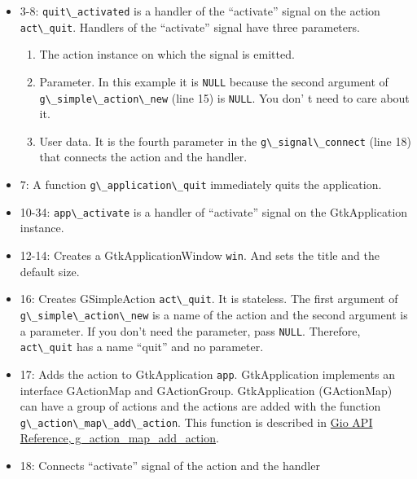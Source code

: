 \begin{itemize}
\tightlist
\item
  3-8: \passthrough{\lstinline!quit\_activated!} is a handler of the
  ``activate'' signal on the action \passthrough{\lstinline!act\_quit!}.
  Handlers of the ``activate'' signal have three parameters.

  \begin{enumerate}
  \def\labelenumi{\arabic{enumi}.}
  \tightlist
  \item
    The action instance on which the signal is emitted.
  \item
    Parameter. In this example it is \passthrough{\lstinline!NULL!}
    because the second argument of
    \passthrough{\lstinline!g\_simple\_action\_new!} (line 15) is
    \passthrough{\lstinline!NULL!}. You don' t need to care about it.
  \item
    User data. It is the fourth parameter in the
    \passthrough{\lstinline!g\_signal\_connect!} (line 18) that connects
    the action and the handler.
  \end{enumerate}
\item
  7: A function \passthrough{\lstinline!g\_application\_quit!}
  immediately quits the application.
\item
  10-34: \passthrough{\lstinline!app\_activate!} is a handler of
  ``activate'' signal on the GtkApplication instance.
\item
  12-14: Creates a GtkApplicationWindow \passthrough{\lstinline!win!}.
  And sets the title and the default size.
\item
  16: Creates GSimpleAction \passthrough{\lstinline!act\_quit!}. It is
  stateless. The first argument of
  \passthrough{\lstinline!g\_simple\_action\_new!} is a name of the
  action and the second argument is a parameter. If you don't need the
  parameter, pass \passthrough{\lstinline!NULL!}. Therefore,
  \passthrough{\lstinline!act\_quit!} has a name ``quit'' and no
  parameter.
\item
  17: Adds the action to GtkApplication \passthrough{\lstinline!app!}.
  GtkApplication implements an interface GActionMap and GActionGroup.
  GtkApplication (GActionMap) can have a group of actions and the
  actions are added with the function
  \passthrough{\lstinline!g\_action\_map\_add\_action!}. This function
  is described in
  \href{https://docs.gtk.org/gio/method.ActionMap.add_action.html}{Gio
  API Reference, g\_action\_map\_add\_action}.
\item
  18: Connects ``activate'' signal of the action and the handler

\end{itemize}
